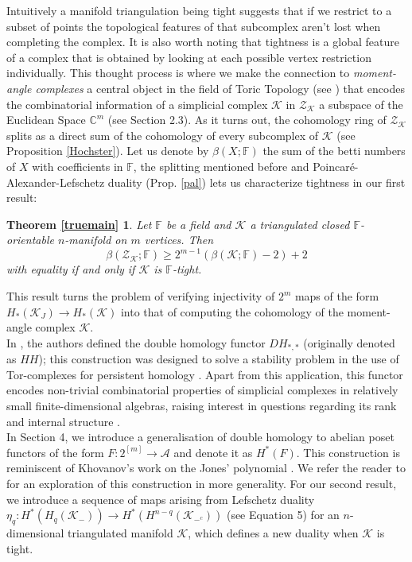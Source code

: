 \documentclass[a4paper]{amsart}
\newtheorem*{thma}{Theorem \ref{truemain}}
\theoremstyle{definition}
\def\K{\mathcal{K}}
\def\A{\mathcal{A}}
\def\ZZ{\mathcal{Z}}
\def\F{\mathbb{F}}
\begin{document}
    Intuitively a manifold triangulation being tight suggests that if we restrict to a subset of points the topological features of that subcomplex aren't lost when completing the complex. It is also worth noting that tightness is a global feature of a complex that is obtained by looking at each possible vertex restriction individually. This thought process is where we make the connection to \textit{moment-angle complexes} a central object in the field of Toric Topology (see \cite[Ch. 4]{ToricTop}) that encodes the combinatorial information of a simplicial complex $\K$ in $\ZZ_\K$ a subspace of the Euclidean Space $\mathbb{C}^m$ (see Section 2.3). As it turns out, the cohomology ring of $\ZZ_\K$ splits as a direct sum of the cohomology of every subcomplex of $\K$ (see Proposition \ref{Hochster}). Let us denote by $\beta(X;\F)$ the sum of the betti numbers of $X$ with coefficients in $\F$, the splitting mentioned before and Poincaré-Alexander-Lefschetz duality (Prop. \ref{pal}) lets us characterize tightness in our first result:

    
    \begin{thma}
        Let $\F$ be a field and $\K$ a triangulated closed $\F$-orientable $n$-manifold on $m$ vertices. Then
        \[\beta(\ZZ_\K;\F)\geq2^{m-1}(\beta(\K;\F)-2)+2\]
        with equality if and only if $\K$ is $\F$-tight.
    \end{thma}
    
    This result turns the problem of verifying injectivity of $2^m$ maps of the form $H_*(\K_J)\to H_*(\K)$ into that of computing the cohomology of the moment-angle complex $\K$.\\

    In \cite{Limonchenko_2023}, the authors defined the double homology functor $DH_{*,*}$ (originally denoted as $HH$); this construction was designed to solve a stability problem in the use of Tor-complexes for persistent homology \cite{Stab}. Apart from this application, this functor encodes non-trivial combinatorial properties of simplicial complexes in relatively small finite-dimensional algebras, raising interest in questions regarding its rank and internal structure 
    \cite{HAN2023108421}\cite{ruiz2024spheretriangulationsdoublehomology}\cite{zhang2024rankdoublecohomologymomentangle}\cite{caputi2025bridginguberhomologydoublehomology}\cite{STANLEY2025109319}. \\
    
    In Section 4, we introduce a generalisation of double homology to abelian poset functors of the form $F: 2^{[m]}\to \A$ and denote it as $H^*(F)$. This construction is reminiscent of Khovanov's work on the Jones' polynomial \cite{jonespoly}. We refer the reader to \cite[\S6]{chandler} for an exploration of this construction in more generality. For our second result, we introduce a sequence of maps arising from Lefschetz duality $\eta_q:H^*(H_q(\K_-))\to H^*(H^{n-q}(\K_{-^c}))$ (see Equation 5) for an $n$-dimensional triangulated manifold $\K$, which defines a new duality when $\K$ is tight.
    
\end{document}
